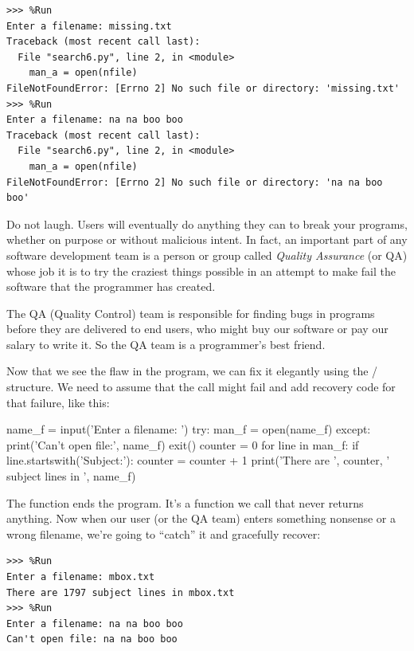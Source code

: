 \begin{Verbatim}[frame=single]
>>> %Run
Enter a filename: missing.txt
Traceback (most recent call last):
  File "search6.py", line 2, in <module>
    man_a = open(nfile)
FileNotFoundError: [Errno 2] No such file or directory: 'missing.txt'
>>> %Run
Enter a filename: na na boo boo
Traceback (most recent call last):
  File "search6.py", line 2, in <module>
    man_a = open(nfile)
FileNotFoundError: [Errno 2] No such file or directory: 'na na boo boo'
\end{Verbatim}

Do not laugh. Users will eventually do anything they can to break your programs, whether on purpose or without malicious intent. In fact, an important part of any software development team is a person or group called \emph{Quality Assurance} (or QA) whose job it is to try the craziest things possible in an attempt to make fail the software that the programmer has created.

 

The QA (Quality Control) team is responsible for finding bugs in programs before they are delivered to end users, who might buy our software or pay our salary to write it. So the QA team is a programmer's best friend.

  
  

Now that we see the flaw in the program, we can fix it elegantly using the / structure. We need to assume that the  call might fail and add recovery code for that failure, like this:

\begin{python}[frame=single]
name_f = input('Enter a filename: ')
try:
    man_f = open(name_f)
except:
    print('Can't open file:', name_f)
    exit()
counter = 0
for line in man_f:
    if line.startswith('Subject:'):
        counter = counter + 1
print('There are ', counter, ' subject lines in ', name_f)
\end{python}

The  function ends the program. It's a function we call that never returns anything. Now when our user (or the QA team) enters something nonsense or a wrong filename, we're going to ``catch'' it and gracefully recover:

\begin{Verbatim}[frame=single]
>>> %Run
Enter a filename: mbox.txt
There are 1797 subject lines in mbox.txt
>>> %Run
Enter a filename: na na boo boo
Can't open file: na na boo boo
\end{Verbatim}

